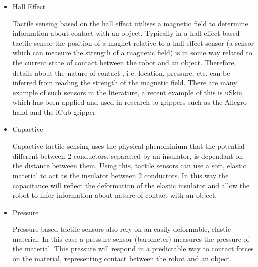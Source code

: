 \begin{itemize}
    \item Hall Effect
    
    Tactile sensing based on the hall effect utilises a magnetic field to determine information about contact with an object. Typically in a hall effect based tactile sensor the position of a magnet relative to a hall effect sensor (a sensor which can measure the strength of a magnetic field) is in some way related to the current state of contact between the robot and an object. Therefore, details about the nature of contact , i.e. location, pressure, etc. can be inferred from reading the strength of the magnetic field. There are many example of such sensors in the literature, a recent example of this is uSkin \cite{uSkinFingertip} which has been applied and used in research to grippers such as the Allegro hand \cite{Allegro} and the iCub gripper \cite{iCub}
    \item Capactive
    
    Capactive tactile sensing uses the physical phenominium that the potential different between 2 conductors, separated by an insulator, is dependant on the distance between them. Using this, tactile sensors can use a soft, elastic material to act as the insulator between 2 conductors. In this way the capacitance will reflect the deformation of the elastic insulator and allow the robot to infer information about nature of contact with an object. 
    \item Pressure
    
    Pressure based tactile sensors also rely on an easily deformable, elastic material. In this case a pressure sensor (barometer) measures the pressure of the material. This pressure will respond in a predictable way to contact forces on the material, representing contact between the robot and an object.
\end{itemize}




